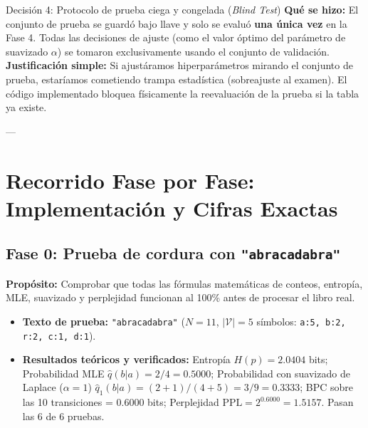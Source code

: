 \documentclass[11pt,letterpaper]{article}
\begin{document}
\begin{decisionbox}{Decisión 4: Protocolo de prueba ciega y congelada (\textit{Blind Test})}
\textbf{Qué se hizo:} El conjunto de prueba se guardó bajo llave y solo se evaluó \textbf{una única vez} en la Fase 4. Todas las decisiones de ajuste (como el valor óptimo del parámetro de suavizado $\alpha$) se tomaron exclusivamente usando el conjunto de validación.\\[3pt]
\textbf{Justificación simple:} Si ajustáramos hiperparámetros mirando el conjunto de prueba, estaríamos cometiendo trampa estadística (sobreajuste al examen). El código implementado bloquea físicamente la reevaluación de la prueba si la tabla ya existe.
\end{decisionbox}

---

\section{Recorrido Fase por Fase: Implementación y Cifras Exactas}

\subsection{Fase 0: Prueba de cordura con \texttt{"abracadabra"}}
\textbf{Propósito:} Comprobar que todas las fórmulas matemáticas de conteos, entropía, MLE, suavizado y perplejidad funcionan al 100\% antes de procesar el libro real.
\begin{itemize}[leftmargin=*, nosep]
    \item \textbf{Texto de prueba:} \texttt{"abracadabra"} ($N=11$, $|\mathcal{V}|=5$ símbolos: \texttt{a:5, b:2, r:2, c:1, d:1}).
    \item \textbf{Resultados teóricos y verificados:} Entropía $H(p) = 2.0404$ bits; Probabilidad MLE $\hat{q}(b|a) = 2/4 = 0.5000$; Probabilidad con suavizado de Laplace ($\alpha=1$) $\hat{q}_1(b|a) = (2+1)/(4+5) = 3/9 = 0.3333$; BPC sobre las 10 transiciones = $0.6000$ bits; Perplejidad $\text{PPL} = 2^{0.6000} = 1.5157$. Pasan las 6 de 6 pruebas.
\end{itemize}
\end{document}
